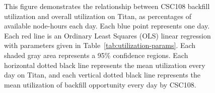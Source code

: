 \begin{figure}
  \vspace{1em}
  \caption{This figure demonstrates the relationship between CSC108 backfill
utilization and overall utilization on Titan, as percentages of available
node-hours each day. Each blue point represents one day. Each red line is an
Ordinary Least Squares (OLS) linear regression with parameters given in
Table~\ref{tab:utilization-params}. Each shaded gray area represents a 95\%
confidence regions. Each horizontal dotted black line represents the mean
utilization every day on Titan, and each vertical dotted black line represents
the mean utilization of backfill opportunity every day by CSC108.}
\end{figure}


